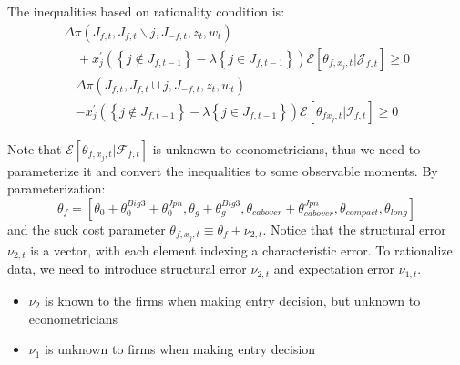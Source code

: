\documentclass{book}
\theoremstyle{plain}
\theoremstyle{definition}
\begin{document}
The inequalities based on rationality condition is:
\[\begin{array}{l}{\Delta \pi\left(J_{f, t}, J_{f, t} \backslash j, J_{-f, t}, z_{t}, w_{t}\right)} \\ {\quad+x_{j}^{\prime}\left(\left\{j \notin J_{f, t-1}\right\}-\lambda\left\{j \in J_{f, t-1}\right\}\right) \mathscr{E}\left[\theta_{f, x_{j}, t} | \mathscr{J}_{f, t}\right] \geq 0}\end{array} \tag{6}\]
\[\begin{array}{l}{\Delta \pi\left(J_{f, t}, J_{f, t} \cup j, J_{-f, t}, z_{t}, w_{t}\right)} \\ {-x_{j}^{\prime}\left(\left\{j \notin J_{f, t-1}\right\}-\lambda\left\{j \in J_{f, t-1}\right\}\right) \mathscr{E}\left[\theta_{f x_{j}, t} | \mathscr{I}_{f, t}\right] \geq 0}\end{array} \tag{7}\]

Note that $\mathcal E [\theta_{f,x_j,t}|\mathcal F_{f,t}]$ is unknown to econometricians, thus we need to parameterize it and convert the inequalities to some observable moments. By parameterization:
\[\theta_{f}=\left[\theta_{0}+\theta_{0}^{B i g 3}+\theta_{0}^{J p n}, \theta_{g}+\theta_{g}^{B i g 3}, \theta_{c a b o v e r}+\theta_{c a b o v e r}^{J p n}, \theta_{c o m p a c t}, \theta_{l o n g}\right]\]
and the suck cost parameter $\theta_{f,x_j,t} \equiv \theta_f + \nu_{2,t}$.
Notice that the structural error $\nu_{2,t}$ is a vector, with each element indexing a characteristic error.
To rationalize data, we need to introduce structural error $\nu_{2,t}$ and expectation error $\nu_{1,t}$.
\begin{itemize}
	\item $\nu_2$ is known to the firms when making entry decision, but unknown to econometricians
	\item $\nu_1$ is unknown to firms when making entry decision
\end{itemize}
\end{document}
